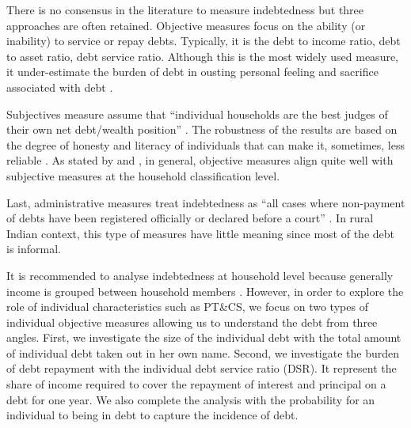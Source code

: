 \documentclass[a4paper, 11pt, onecolumn]{article}
\newcommand{\PTCS}{PT\&CS}
\begin{document}
There is no consensus in the literature to measure indebtedness but three approaches are often retained.
Objective measures focus on the ability (or inability) to service or repay debts.
Typically, it is the debt to income ratio, debt to asset ratio, debt service ratio.
Although this is the most widely used measure, it under-estimate the burden of debt in ousting personal feeling and sacrifice associated with debt \citep{Betti2007}.
 
Subjectives measure assume that ``individual households are the best judges of their own net debt/wealth position'' \citep{Betti2007}.
The robustness of the results are based on the degree of honesty and literacy of individuals that can make it, sometimes, less reliable \citep{DAlessio2013}.
As stated by \cite{Rinaldi2006} and \cite{Keese2012}, in general, objective measures align quite well with subjective measures at the household classification level.

Last, administrative measures treat indebtedness  as ``all cases where non-payment of debts have been registered officially or declared before a court'' \citep{Betti2007}.
In rural Indian context, this type of measures have little meaning since most of the debt is informal.


It is recommended to analyse indebtedness at household level because generally income is grouped between household members \citep{European2010}.
However, in order to explore the role of individual characteristics such as \PTCS, we focus on two types of individual objective measures allowing us to understand the debt from three angles.
First, we investigate the size of the individual debt with the total amount of individual debt taken out in her own name.
Second, we investigate the burden of debt repayment with the individual debt service ratio (DSR).
It represent the share of income required to cover the repayment of interest and principal on a debt for one year.
We also complete the analysis with the probability for an individual to being in debt to capture the incidence of debt.

\end{document}
